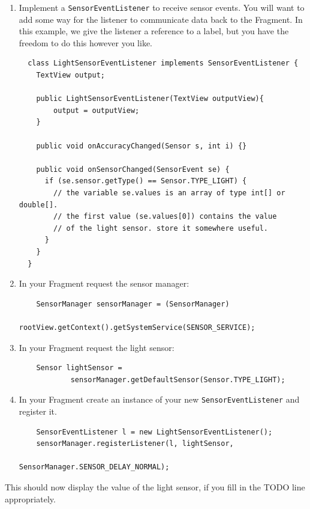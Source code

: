 \documentclass[10pt]{article}
\begin{document}
\begin{enumerate}
\item Implement a {\tt SensorEventListener} to receive sensor events. You will want to add some way for the listener to communicate data back to the Fragment. In this example, we give the listener a reference to a label, but you have the freedom to do this however you like.
\begin{verbatim}
  class LightSensorEventListener implements SensorEventListener {
  	TextView output;
  	
    public LightSensorEventListener(TextView outputView){
    	output = outputView;
    }
    
    public void onAccuracyChanged(Sensor s, int i) {}

    public void onSensorChanged(SensorEvent se) {
      if (se.sensor.getType() == Sensor.TYPE_LIGHT) {
        // the variable se.values is an array of type int[] or double[]. 
        // the first value (se.values[0]) contains the value 
        // of the light sensor. store it somewhere useful.
      }
    }
  }
\end{verbatim}
\item In your Fragment request the sensor manager:
\vspace*{-1em}
\begin{verbatim}
    SensorManager sensorManager = (SensorManager) 
              rootView.getContext().getSystemService(SENSOR_SERVICE);
\end{verbatim}
\item In your Fragment request the light sensor:
\vspace*{-1em}
\begin{verbatim}
    Sensor lightSensor = 
            sensorManager.getDefaultSensor(Sensor.TYPE_LIGHT);
\end{verbatim}
\item In your Fragment create an instance of your new {\tt SensorEventListener} and register it.
\vspace*{-1em}
\begin{verbatim}
    SensorEventListener l = new LightSensorEventListener();
    sensorManager.registerListener(l, lightSensor, 
                                   SensorManager.SENSOR_DELAY_NORMAL);
\end{verbatim}
\end{enumerate}
This should now display the value of the light sensor, if you fill in the TODO line
appropriately.
\vspace*{-0.5em}
\end{document}
